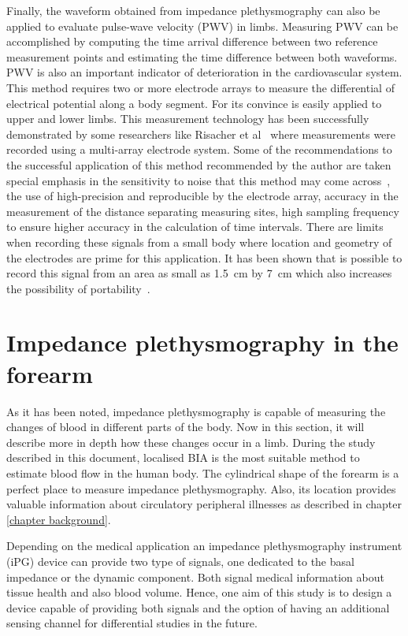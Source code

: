 Finally, the waveform obtained from impedance plethysmography can also be applied to evaluate pulse-wave velocity (PWV) in limbs. Measuring PWV can be accomplished by computing the time arrival difference between two reference measurement points and estimating the time difference between both waveforms. PWV is also an important indicator of deterioration in the cardiovascular system. This method requires two or more electrode arrays to measure the differential of electrical potential along a body segment. For its convince is easily applied to upper and lower limbs. This measurement technology has been successfully demonstrated by some researchers like Risacher et al~\cite{risacher1993impedance} where measurements were recorded using a multi-array electrode system. Some of the recommendations to the successful application of this method recommended by the author are taken special emphasis in the sensitivity to noise that this method may come across~\cite{risacher1992computation}, the use of high-precision and reproducible by the electrode array, accuracy in the measurement of the distance separating measuring sites, high sampling frequency to ensure higher accuracy in the calculation of time intervals. There are limits when recording these signals from a small body where location and geometry of the electrodes are prime for this application. It has been shown that is possible to record this signal from an area as small as \SI{1.5}{\cm} by \SI{7}{\cm} which also increases the possibility of portability~\cite{cho2009bio}. 



\section{Impedance plethysmography in the forearm}
\label{section impedance plethysmography}
As it has been noted, impedance plethysmography is capable of measuring the changes of blood in different parts of the body. Now in this section, it will describe more in depth how these changes occur in a limb. During the study described in this document, localised BIA is the most suitable method to estimate blood flow in the human body. The cylindrical shape of the forearm is a perfect place to measure impedance plethysmography. Also, its location provides valuable information about circulatory peripheral illnesses as described in chapter \ref{chapter background}.

Depending on the medical application an impedance plethysmography instrument (iPG) device can provide two type of signals, one dedicated to the basal impedance or the dynamic component. Both signal medical information about tissue health and also blood volume. Hence, one aim of this study is to design a device capable of providing both signals and the option of having an additional sensing channel for differential studies in the future.

